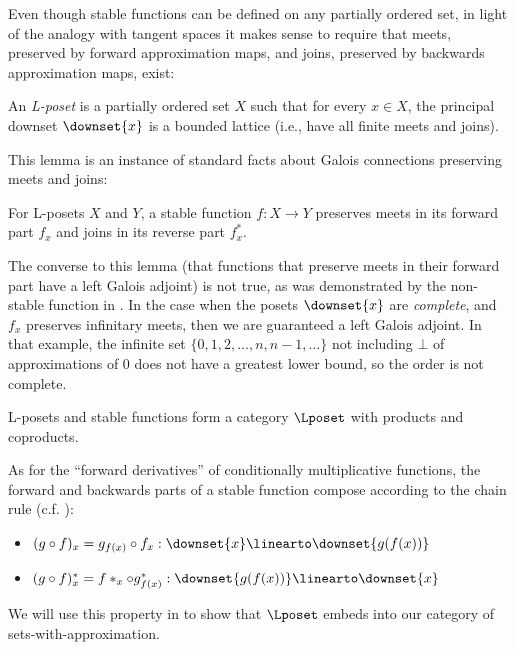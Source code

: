Even though stable functions can be defined on any partially ordered
set, in light of the analogy with tangent spaces it makes sense to
require that meets, preserved by forward approximation maps, and
joins, preserved by backwards approximation maps, exist:

\begin{definition}
  An \emph{L-poset} is a partially ordered set $X$ such that for every $x \in X$, the principal downset $\downset{x}$ is a bounded lattice (i.e., have all finite meets and joins).
\end{definition}

This lemma is an instance of standard facts about Galois connections
preserving meets and joins:

\begin{lemma}
  For L-posets $X$ and $Y$, a stable function $f : X \to Y$ preserves
  meets in its forward part $f_x$ and joins in its reverse part
  $f^*_x$.
\end{lemma}

The converse to this lemma (that functions that preserve meets in their forward part have a left Galois adjoint) is not true, as was demonstrated by the non-stable function in . In the case when the posets $\downset{x}$ are \emph{complete}, and $f_x$ preserves infinitary meets, then we are guaranteed a left Galois adjoint. In that example, the infinite set $\{0, 1, 2, \dots, n, n-1, \dots\}$ not including $\bot$ of approximations of $0$ does not have a greatest lower bound, so the order is not complete.

\begin{theorem}
  L-posets and stable functions form a category $\Lposet$ with products
  and coproducts.
\end{theorem}

\begin{remark}
  \label{rem:chain-rule-stable}
  As for the ``forward derivatives'' of conditionally multiplicative
  functions, the forward and backwards parts of a stable function
  compose according to the chain rule (c.f. ):
  \begin{itemize}
  \item $(g \circ f)_x = g_{f(x)} \circ f_x : \downset{x} \linearto \downset{g(f(x))}$
  \item $(g \circ f)^*_x = f*_x \circ g^*_{f(x)} : \downset{g(f(x))} \linearto \downset{x}$
  \end{itemize}
  We will use this property in  to show that
  $\Lposet$ embeds into our category of sets-with-approximation.
\end{remark}

